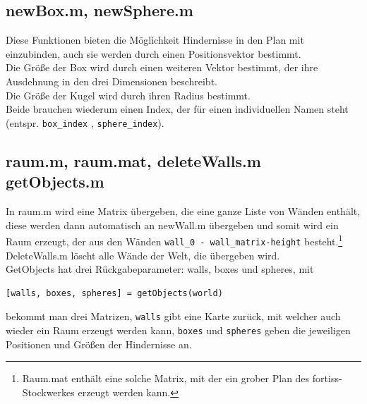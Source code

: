 \documentclass[titlepage, a4paper, ngerman]{article}
\begin{document}
\subsection{newBox.m, newSphere.m}
Diese Funktionen bieten die Möglichkeit Hindernisse in den Plan mit einzubinden, auch sie werden durch einen Positionsvektor bestimmt.\\ 
Die Größe der Box wird durch einen weiteren Vektor bestimmt, der ihre Ausdehnung in den drei Dimensionen beschreibt.\\
Die Größe der Kugel wird durch ihren Radius bestimmt.\\
Beide brauchen wiederum einen Index, der für einen individuellen Namen steht (entspr. \verb|box_index| , \verb|sphere_index|).

\subsection{raum.m, raum.mat, deleteWalls.m getObjects.m}
In raum.m wird eine Matrix übergeben, die eine ganze Liste von Wänden enthält, diese werden dann automatisch an newWall.m übergeben und somit wird ein Raum erzeugt, der aus den Wänden \verb|wall_0 - wall_matrix-height| besteht.\footnote{Raum.mat enthält eine solche Matrix, mit der ein grober Plan des fortiss-Stockwerkes erzeugt werden kann.}\\
DeleteWalls.m löscht alle Wände der Welt, die übergeben wird.\\
GetObjects hat drei Rückgabeparameter: walls, boxes und spheres, mit
\begin{verbatim}
[walls, boxes, spheres] = getObjects(world)
\end{verbatim}
bekommt man drei Matrizen, \verb|walls| gibt eine Karte zurück, mit welcher auch wieder ein Raum erzeugt werden kann, \verb|boxes| und \verb|spheres| geben die jeweiligen Positionen und Größen der Hindernisse an.
\end{document}
